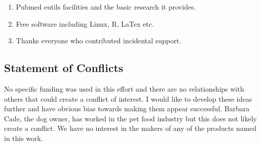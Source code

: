 \documentclass[aps,secnumarabic,balancelastpage,amsmath,amssymb,nofootinbib]{revtex4}
\newcommand{\mjmbasename}{\jobname}
\newcommand{\mjmaddbio}{mjm_tr,releases}
\newcommand{\mjmbasename}{\jobname}
\newcommand{\mjmaddbio}{mjm_tr,releases}
\begin{document}




\begin{acknowledgments} 

% 
\begin{enumerate}
\item Pubmed eutils facilities and the basic research it provides. 
\item Free software including Linux, R, LaTex  etc.
\item Thanks everyone who contributed incidental support. 
\end{enumerate}

\end{acknowledgments}

\clearpage
\appendix

\begin{mdpicomment}

\section{ Statement of Conflicts }
 No specific funding was used in this effort and there are no relationships
with others that could create a conflict of interest. I would like to develop
these ideas further and have obvious bias towards making them appear 
successful. Barbara Cade, the dog owner, has worked in the pet food industry
but this does not likely create a conflict. We have no interest in the
makers of any of the products named in this work.  

\end{mdpicomment}
\end{document}
